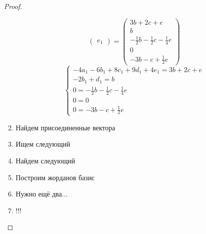 \documentclass[11pt, fleqn]{article}
\begin{document}
\begin{proof}
\begin{enumerate}
\[\begin{pmatrix}
      e_1
    \end{pmatrix} = \begin{pmatrix}
      3b + 2c + e\\
      b\\
      -\frac{1}{2}b - \frac{1}{2}c - \frac{1}{4}e\\
      0\\
      -3b - c + \frac{1}{2}e
    \end{pmatrix}\]
    \[\begin{cases}
      -4a_1 - 6b_1 + 8c_1 + 9d_1 + 4e_1 = 3b + 2c + e\\
      -2b_1 + d_1 = b\\
      0 = -\frac{1}{2}b - \frac{1}{2}c - \frac{1}{4}e\\
      0 = 0\\
      0 = -3b - c + \frac{1}{2}e
    \end{cases}\]
    \item Найдем присоединенные вектора
    \item Ищем следующий
    \item Найдем следующий
    \item Построим жорданов базис
    \item Нужно ещё два...
    \item !!!
  \end{enumerate}
\end{proof}
\end{document}
